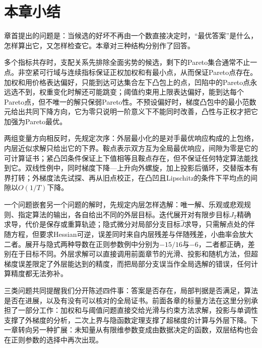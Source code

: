 \section{本章小结}
\label{sec:opt-mmb-summary}

章首提出的问题是：当候选的好坏不再由一个数直接决定时，“最优答案”是什么，怎样算出它，又怎样检查它。本章对三种结构分别作了回答。

多个指标共存时，支配关系先排除全面劣势的候选，剩下的Pareto集合通常不止一点。非空紧可行域与连续指标保证正权加权和有最小点，从而保证Pareto点存在。加权和用价格表达偏好，只能到达可达集合左下凸包上的点，凹陷中的Pareto点永远选不到，权重变化时解还可能跳变；阈值约束用上限表达偏好，能到达每个Pareto点，但不唯一的解只保弱Pareto性。不预设偏好时，梯度凸包中的最小范数元给出共同下降方向，它为零只说明一阶意义下不能同时改善，凸性与正权才把它加强为Pareto最优。

两组变量方向相反时，先规定次序：外层最小化的是对手最优响应构成的上包络，内层近似求解只给出它的下界。鞍点表示双方互为全局最优响应，间隙为零是它的可计算证书；紧凸凹条件保证上下值相等且鞍点存在，但不保证任何特定算法能找到它。双线性例中，同时梯度下降—上升向外螺旋，加上投影后循环，交替版本有界打转；外梯度法先试探、再从旧点校正，在凸凹且Lipschitz的条件下平均点的间隙以$O(1/T)$下降。

一个问题嵌套另一个问题的解时，先规定内层怎样选解：唯一解、乐观或悲观规则、指定算法的输出，各自给出不同的外层目标。迭代展开对有限步目标$J_T$精确求导，代价是保存或重算轨迹；隐式微分对局部分支目标$\widehat J$求导，只需解点处的伴随方程，但要求Hessian可逆，误差同时来自内层残差与伴随残差，小曲率会放大二者。展开与隐式两种导数在正则参数例中分别为$-15/16$与$-6$，二者都正确，差别在于目标不同。外层求解可以直接调用前面章节的光滑、投影和随机方法，但超梯度误差限定了外层能达到的精度，而把局部分支误当作全局选解的错误，任何计算精度都无法弥补。

三类问题共同提醒我们分开陈述四件事：答案是否存在，局部判据是否满足，算法是否在进展，以及有没有可以核对的全局证书。前面各章的标量方法在这里分别承担了一部分工作：加权和与阈值问题直接交给光滑与约束方法求解，投影与单调性支撑了外梯度的分析，二次上界与隐函数定理支撑了超梯度的计算与外层下降。下一章转向另一种扩展：未知量从有限维参数变成由数据决定的函数，双层结构也会在正则参数的选择中再次出现。
